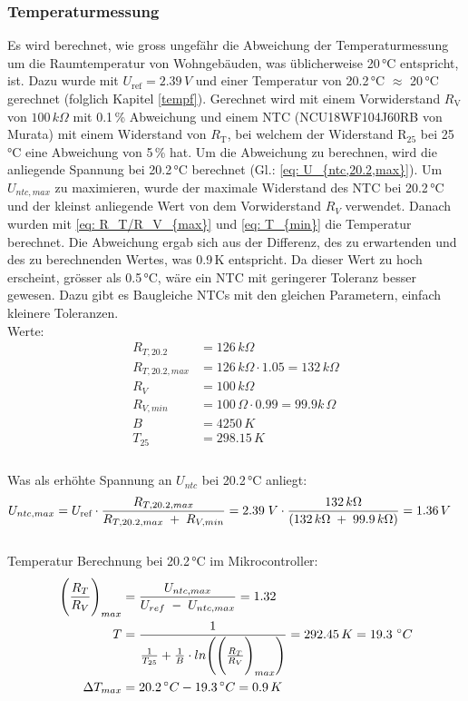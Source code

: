 \subsubsection{Temperaturmessung} \label{Temperaturmessung}
Es wird berechnet, wie gross ungefähr die Abweichung der Temperaturmessung um die Raumtemperatur von Wohngebäuden, was üblicherweise 20\,°C entspricht, ist. Dazu wurde mit $U_\text{ref} = 2.39\,V$ und einer Temperatur von 20.2\,°C $\approx$ 20\,°C  gerechnet (folglich Kapitel \ref{tempf}). Gerechnet wird mit einem Vorwiderstand $R_{\text{V}}$ von $100\,k\Omega$ mit 0.1\,\% Abweichung und einem NTC (NCU18WF104J60RB von Murata) mit einem Widerstand von $R_{\text{T}}$, bei welchem der Widerstand R$_{25}$ bei 25\,°C eine Abweichung von 5\,\% hat. Um die Abweichung zu berechnen, wird die anliegende Spannung bei 20.2\,°C berechnet (Gl.: \ref{eq: U_{ntc,20.2,max}}). Um $U_{ntc,max}$ zu maximieren, wurde der maximale Widerstand des NTC bei 20.2\,°C und der kleinst anliegende Wert von dem Vorwiderstand $R_V$ verwendet. Danach wurden mit \ref{eq: R_T/R_V_{max}} und \ref{eq: T_{min}} die Temperatur berechnet. Die Abweichung ergab sich aus der Differenz, des zu erwartenden und des zu berechnenden Wertes, was 0.9\,K entspricht. Da dieser Wert zu hoch erscheint, grösser als 0.5\,°C, wäre ein NTC mit geringerer Toleranz besser gewesen. Dazu gibt es Baugleiche NTCs mit den gleichen Parametern, einfach kleinere Toleranzen.
\\
Werte:
\begin{align*}
R_{T,20.2} &= 126\,k\Omega\\
R_{T,20.2,max} &= 126\,k\Omega \cdot 1.05 = 132\,k\Omega\\
R_V &= 100\,k\Omega\\
R_{V,min} &= 100\,\Omega \cdot 0.99 = 99.9k\,\Omega\\
B &= 4250\,K\\
T_{25} &= 298.15\,K\\
\end{align*}
\\
Was als erhöhte Spannung an $U_{ntc}$ bei 20.2\,°C anliegt:
\begin{align}
U_{ntc,max} &= U_{\text{ref}} \cdot \frac{R_{T,20.2,max}}{R_{T,20.2,max}\;+\;R_{V,min}} = 2.39\;V \cdot \frac{ 132\,k\Omega}{(132\,k\Omega\;+\;99.9\,k\Omega)} = 1.36\,V\label{eq: U_{ntc,20.2,max}}
\end{align}
\\
Temperatur Berechnung bei 20.2\,°C im Mikrocontroller:
\begin{align}
\Biggl( \frac{R_T}{R_V}\Biggr)_{max} &= \frac{U_{ntc,max}}{U_{ref}\;-\;U_{ntc,max}} = 1.32 \label{eq: R_T/R_V_{max}}\\
T &= \frac{1}{\frac{1}{T_{25}}+\frac{1}{B} \cdot ln\Biggl( \Biggl( \frac{R_T}{R_V}\Biggr)_{max}\Biggr)} = 292.45\,K = 19.3\,\,^\circ C \label{eq: T_{min}}\\
\Delta T_{max} &= 20.2\,^\circ C - 19.3\,^\circ C = 0.9\,K \label{dT_{max}}
\end{align}

